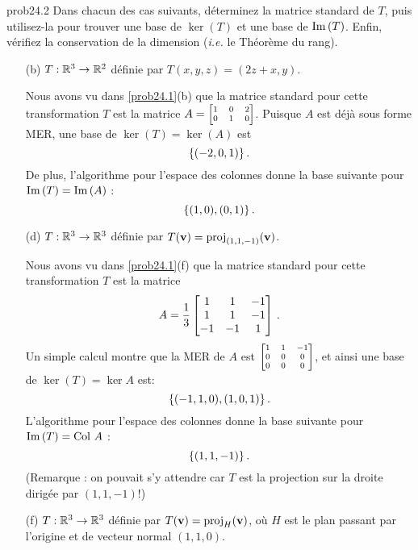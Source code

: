 \bigskip
\begin{sol}{prob24.2} Dans chacun des cas suivants, déterminez la matrice standard de $T$, puis utilisez-la pour trouver une base de $\ker( T)$ et une base de $\operatorname{Im}\,( T)$. Enfin, vérifiez la conservation de la dimension (\textit{i.e.} le Théorème du rang). 


\begin{enumerate}[]

\medskip
\item[(b)] $T:\mathbb{R}^3 \to \mathbb{R}^2$ d\'efinie par $T(x,y,z)=(2 z+x, y)$.

\soln Nous avons vu dans \ref{prob24.1}(b) que la matrice standard pour cette transformation $T$ est la matrice $A=\scriptsize\bmatrix 1&0&2\\0&1&0 \endbmatrix$.
Puisque $A$ est déjà sous forme MER, une base de $\ker (T)= \ker (A)$ est  
$$\{(-2,0,1)\}\,.$$ 
De plus, l'algorithme pour l'espace des colonnes donne la base suivante pour  $\operatorname{Im}\, (T) = \operatorname{Im}\, (A)$ :
$$\{(1,0), (0,1)\}\,.$$
\medskip



\item[(d)] $T:\mathbb{R}^3 \to \mathbb{R}^3$ d\'efinie par $T(\mathbf{v})= \operatorname{proj}_{(1,1,-1)}(\mathbf{v})$.

\soln Nous avons vu dans \ref{prob24.1}(f) que la matrice standard pour cette transformation $T$ est la matrice 
$$A= \frac13\bmatrix
 1& 1& -1\\
 1& 1& -1\\ 
-1& -1& 1\endbmatrix\,.$$
Un simple calcul montre que la MER de $A$ est $\scriptsize\bmatrix 1 & 1 & -1 \\
 0 & 0 & 0 \\
 0 & 0 & 0  \endbmatrix$, et ainsi une base de $\ker(T)= \ker A$ est:
 $$\{(-1,1,0),(1,0,1)\}\,.$$
L'algorithme pour l'espace des colonnes donne la base suivante pour  $\operatorname{Im}\,(T) = \operatorname{Col\,} A$ :
 $$\{(1,1,-1)\}\,.$$
(Remarque : on pouvait s'y attendre car $T$ est la projection sur la droite dirigée par $(1,1,-1)$!)
\medskip


\item[(f)]  $T:\mathbb{R}^3 \to \mathbb{R}^3$ d\'efinie par $T(\mathbf{v})= \operatorname{proj}_H(\mathbf{v})$, où $H$ est le plan passant par l'origine et de vecteur normal $(1,1,0)$.


\end{enumerate}
\end{sol}
